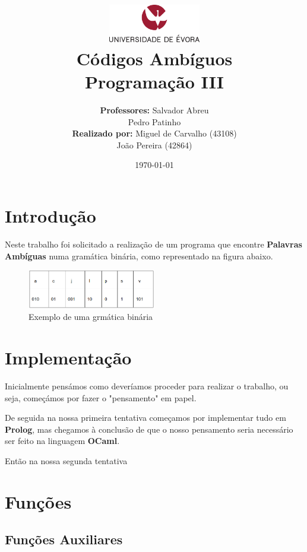 \documentclass[11pt]{article}   %
\title
{
    \includegraphics[width=0.3\textwidth]{images/logo_universidade.png}
    \\[0.1cm]
    \textbf{Códigos Ambíguos} \\
    Programação III
}
\author
{
    \textbf{Professores:} Salvador Abreu \\ Pedro Patinho \\
    \textbf{Realizado por:} Miguel de Carvalho (43108) \\ João Pereira (42864) 
}
\date{\today}
\begin{document}
\maketitle

\section{Introdução} 
\hspace{0,5cm}Neste trabalho foi solicitado a realização de um programa que encontre 
\textbf{Palavras Ambíguas} numa gramática binária, como representado na figura abaixo.

\begin{figure}[h!]
    \begin{center}
        \includegraphics[width=0.5\textwidth]{images/gramatica.png}
        \caption{Exemplo de uma grmática binária}
    \end{center}
\end{figure}

\section{Implementação}

\hspace{0,5cm}Inicialmente pensámos como deveríamos proceder para realizar o trabalho, ou seja,
começámos por fazer o "pensamento" em papel. 

De seguida na nossa primeira tentativa começamos por implementar tudo em \textbf{Prolog}, mas 
chegamos à conclusão de que o nosso pensamento seria necessário ser feito na linguagem \textbf{OCaml}.

Então na nossa segunda tentativa
\section{Funções}

\subsection{Funções Auxiliares}
\end{document}
